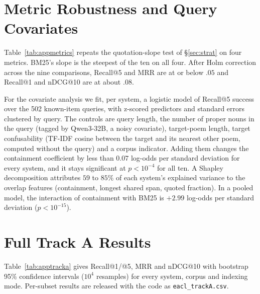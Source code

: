 \documentclass[11pt]{article}
\begin{document}
\section{Metric Robustness and Query Covariates}
\label{app:robust}
Table~\ref{tab:appmetrics} repeats the quotation-slope test of \S\ref{sec:strat} on four metrics. BM25's slope is the steepest of the ten on all four. After Holm correction across the nine comparisons, Recall@5 and MRR are at or below $.05$ and Recall@1 and nDCG@10 are at about $.08$.

\begin{table}[h]
\centering\scriptsize
\setlength{\tabcolsep}{2.5pt}

\caption{Quotation slope (quoting minus non-quoting subset) on \textit{Fann or Flop}, verse mode, and BM25's difference against Qwen3-8B (paired bootstrap, $10^4$ resamples).}
\label{tab:appmetrics}
\end{table}

For the covariate analysis we fit, per system, a logistic model of Recall@5 success over the 502 known-item queries, with z-scored predictors and standard errors clustered by query. The controls are query length, the number of proper nouns in the query (tagged by Qwen3-32B, a noisy covariate), target-poem length, target confusability (TF-IDF cosine between the target and its nearest other poem, computed without the query) and a corpus indicator. Adding them changes the containment coefficient by less than $0.07$ log-odds per standard deviation for every system, and it stays significant at $p<10^{-4}$ for all ten. A Shapley decomposition attributes $59$ to $85\%$ of each system's explained variance to the overlap features (containment, longest shared span, quoted fraction). In a pooled model, the interaction of containment with BM25 is $+2.99$ log-odds per standard deviation ($p<10^{-15}$).

\section{Full Track A Results}
\label{app:full}
Table~\ref{tab:apptracka} gives Recall@1/@5, MRR and nDCG@10 with bootstrap 95\% confidence intervals ($10^4$ resamples) for every system, corpus and indexing mode. Per-subset results are released with the code as \texttt{eacl\_trackA.csv}.

\begin{table}[t]
\centering\scriptsize
\setlength{\tabcolsep}{3pt}

\caption{Track A in full, with bootstrap 95\% confidence intervals.}
\label{tab:apptracka}
\end{table}
\end{document}
